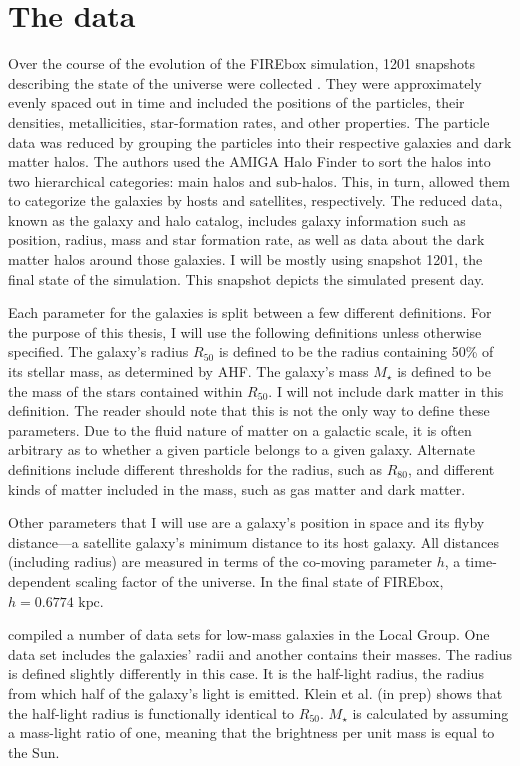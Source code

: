 \section{The data}
Over the course of the evolution of the FIREbox simulation, 1201 snapshots describing the state of the universe were collected \citep{feldmannFIREboxSimulatingGalaxies2022}. They were approximately evenly spaced out in time and included the positions of the particles, their densities, metallicities, star-formation rates, and other properties. The particle data was reduced by grouping the particles into their respective galaxies and dark matter halos. The authors used the AMIGA Halo Finder \citep[AHF;][]{knollmannAhfAMIGAHALO2009} to sort the halos into two hierarchical categories: main halos and sub-halos. This, in turn, allowed them to categorize the galaxies by hosts and satellites, respectively. The reduced data, known as the galaxy and halo catalog, includes galaxy information such as position, radius, mass and star formation rate, as well as data about the dark matter halos around those galaxies. I will be mostly using snapshot 1201, the final state of the simulation. This snapshot depicts the simulated present day.

Each parameter for the galaxies is split between a few different definitions. For the purpose of this thesis, I will use the following definitions unless otherwise specified. The galaxy's radius $R_{50}$ is defined to be the radius containing 50\% of its stellar mass, as determined by AHF. The galaxy's mass $M_\star$ is defined to be the mass of the stars contained within $R_{50}$. I will not include dark matter in this definition. The reader should note that this is not the only way to define these parameters. Due to the fluid nature of matter on a galactic scale, it is often arbitrary as to whether a given particle belongs to a given galaxy. Alternate definitions include different thresholds for the radius, such as $R_{80}$, and different kinds of matter included in the mass, such as gas matter and dark matter.

Other parameters that I will use are a galaxy's position in space and its flyby distance---a satellite galaxy's minimum distance to its host galaxy. All distances (including radius) are measured in terms of the co-moving parameter $h$, a time-dependent scaling factor of the universe. In the final state of FIREbox, $h = 0.6774 \text{ kpc}$. 

\cite{mcconnachieOBSERVEDPROPERTIESDWARF2012} compiled a number of data sets for low-mass galaxies in the Local Group. One data set includes the galaxies' radii and another contains their masses. The radius is defined slightly differently in this case. It is the half-light radius, the radius from which half of the galaxy's light is emitted.
Klein et al. (in prep) shows that the half-light radius is functionally identical to $R_{50}$. $M_\star$ is calculated by assuming a mass-light ratio of one, meaning that the brightness per unit mass is equal to the Sun.

